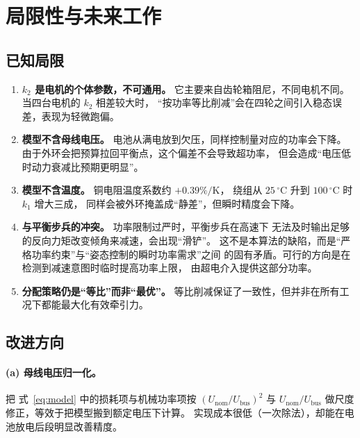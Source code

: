 \documentclass[cn,blue,11pt,device=normal]{elegantnote}
\newcommand{\fref}[1]{式~\eqref{#1}}
\begin{document}
\section{局限性与未来工作}\label{sec:future}

\subsection{已知局限}

\begin{enumerate}
  \item \textbf{$k_2$ 是电机的个体参数，不可通用。}
  它主要来自齿轮箱阻尼，不同电机不同。当四台电机的 $k_2$ 相差较大时，
  “按功率等比削减”会在四轮之间引入稳态误差，表现为轻微跑偏。
  \item \textbf{模型不含母线电压。} 电池从满电放到欠压，同样控制量对应的功率会下降。
  由于外环会把预算拉回平衡点，这个偏差不会导致超功率，
  但会造成“电压低时动力衰减比预期更明显”。
  \item \textbf{模型不含温度。} 铜电阻温度系数约 $+0.39\%/\mathrm{K}$，
  绕组从 $25\,^{\circ}\mathrm{C}$ 升到 $100\,^{\circ}\mathrm{C}$ 时 $k_1$ 增大三成，
  同样会被外环掩盖成“静差”，但瞬时精度会下降。
  \item \textbf{与平衡步兵的冲突。} 功率限制过严时，平衡步兵在高速下
  无法及时输出足够的反向力矩改变倾角来减速，会出现“滑铲”。
  这不是本算法的缺陷，而是“严格功率约束”与“姿态控制的瞬时功率需求”之间
  的固有矛盾。可行的方向是在检测到减速意图时临时提高功率上限，
  由超电介入提供这部分功率。
  \item \textbf{分配策略仍是“等比”而非“最优”。}
  等比削减保证了一致性，但并非在所有工况下都能最大化有效牵引力。
\end{enumerate}

\subsection{改进方向}

\paragraph{(a) 母线电压归一化。}
把 \fref{eq:model} 中的损耗项与机械功率项按 $(U_{\mathrm{nom}}/U_{\mathrm{bus}})^{2}$
与 $U_{\mathrm{nom}}/U_{\mathrm{bus}}$ 做尺度修正，等效于把模型搬到额定电压下计算。
实现成本很低（一次除法），却能在电池放电后段明显改善精度。
\end{document}
